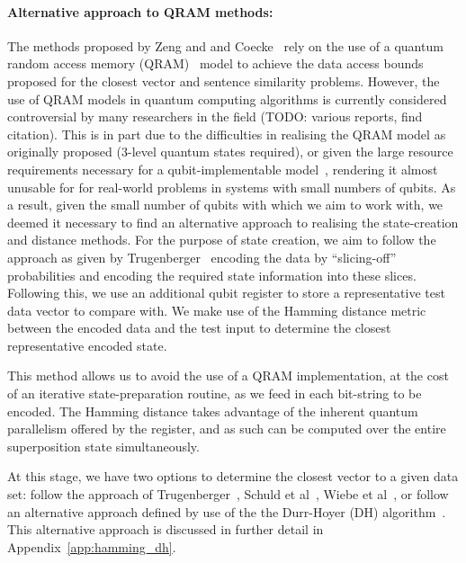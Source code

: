 \paragraph{Alternative approach to QRAM methods:}\label{par:qram_alt_approach} The methods proposed by Zeng and and Coecke~\cite{DisCoWillBob} rely on the use of a quantum random access memory (QRAM)~\cite{Giovannetti_Lloyd_Maccone_2008} model to achieve the data access bounds proposed for the closest vector and sentence similarity problems. However, the use of QRAM models in quantum computing algorithms is currently considered controversial by many researchers in the field (TODO: various reports, find citation). This is in part due to the difficulties in realising the QRAM model as originally proposed (3-level quantum states required), or given the large resource requirements necessary for a qubit-implementable model~\cite{Arunachalam_Gheorghiu_Jochym-OConnor_Mosca_Srinivasan_2015}, rendering it almost unusable for for real-world  problems in systems with small numbers of qubits. As a result, given the small number of qubits with which we aim to work with, we deemed it necessary to find an alternative approach to realising the state-creation and distance methods. For the purpose of state creation, we aim to follow the approach as given by Trugenberger~\cite{Trugenberger_2001,Trugenberger_2002} encoding the data by ``slicing-off'' probabilities and encoding the required state information into these slices. Following this, we use an additional qubit register to store a representative test data vector to compare with. We make use of the Hamming distance metric between the encoded data and the test input to determine the closest representative encoded state.

This method allows us to avoid the use of a QRAM implementation, at the cost of an iterative state-preparation routine, as we feed in each bit-string to be encoded. The Hamming distance takes advantage of the inherent quantum parallelism offered by the register, and as such can be computed over the entire superposition state simultaneously. 

At this stage, we have two options to determine the closest vector to a given data set: follow the approach of Trugenberger~\cite{Trugenberger_2001,Trugenberger_2002}, Schuld et al~\cite{Schuld_Sinayskiy_Petruccione_2014}, Wiebe et al~\cite{Wiebe_Kapoor_Svore_2014}, or follow an alternative approach defined by use of the the Durr-Hoyer (DH) algorithm~\cite{Durr_Hoyer_1996}. This alternative approach is discussed in further detail in Appendix~\ref{app:hamming_dh}.


